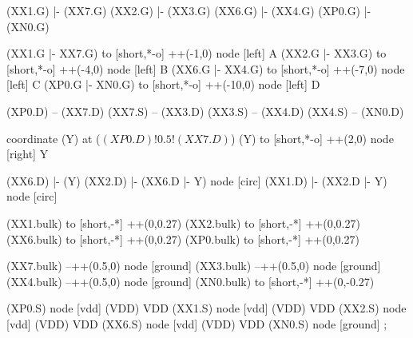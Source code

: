 \begin{circuitikz}[american]

	(XX1.G) |- (XX7.G)
	(XX2.G) |- (XX3.G)
	(XX6.G) |- (XX4.G)
	(XP0.G) |- (XN0.G)
	
	(XX1.G |- XX7.G) to [short,*-o] ++(-1,0) node [left] {A}
	(XX2.G |- XX3.G) to [short,*-o] ++(-4,0) node [left] {B}
	(XX6.G |- XX4.G) to [short,*-o] ++(-7,0) node [left] {C}
	(XP0.G |- XN0.G) to [short,*-o] ++(-10,0) node [left] {D}
	
	(XP0.D) -- (XX7.D)
	(XX7.S) -- (XX3.D)
	(XX3.S) -- (XX4.D)
	(XX4.S) -- (XN0.D)
	
	coordinate (Y) at ($(XP0.D)!0.5!(XX7.D)$)
	(Y) to [short,*-o] ++(2,0) node [right] {Y}
	
	(XX6.D) |- (Y)
	(XX2.D) |- (XX6.D |- Y) node [circ]{}
	(XX1.D) |- (XX2.D |- Y) node [circ]{}
	
	(XX1.bulk) to [short,-*] ++(0,0.27)
	(XX2.bulk) to [short,-*] ++(0,0.27)
	(XX6.bulk) to [short,-*] ++(0,0.27)
	(XP0.bulk) to [short,-*] ++(0,0.27)
	
	(XX7.bulk) --++(0.5,0) node [ground] {}
	(XX3.bulk) --++(0.5,0) node [ground] {}
	(XX4.bulk) --++(0.5,0) node [ground] {}
	(XN0.bulk) to [short,-*] ++(0,-0.27)


	(XP0.S) node [vdd] (VDD) {VDD}
	(XX1.S) node [vdd] (VDD) {VDD}
	(XX2.S) node [vdd] (VDD) {VDD}
	(XX6.S) node [vdd] (VDD) {VDD}
	(XN0.S) node [ground] {}
;

\end{circuitikz}
